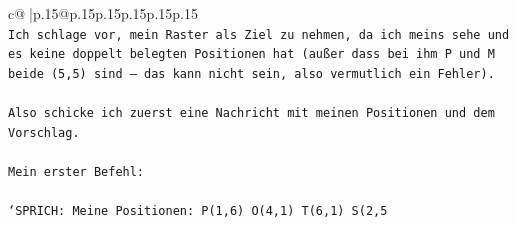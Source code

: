 \documentclass{article}
\begin{document}
{\begin{supertabular}{c@{$\;$}|p{.15\linewidth}@{}p{.15\linewidth}p{.15\linewidth}p{.15\linewidth}p{.15\linewidth}p{.15\linewidth}}
{{{\\ 
\texttt{Ich schlage vor, mein Raster als Ziel zu nehmen, da ich meins sehe und es keine doppelt belegten Positionen hat (außer dass bei ihm P und M beide (5,5) sind — das kann nicht sein, also vermutlich ein Fehler).} \\
\\ 
\texttt{Also schicke ich zuerst eine Nachricht mit meinen Positionen und dem Vorschlag.} \\
\\ 
\texttt{Mein erster Befehl:} \\
\\ 
\texttt{`SPRICH: Meine Positionen: P(1,6) O(4,1) T(6,1) S(2,5} \\
            }
        }
    }
     \\ \\


\end{supertabular}}
\end{document}
